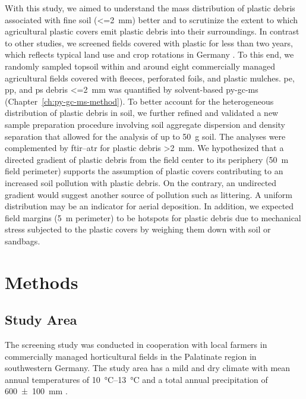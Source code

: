 With this study, we aimed to understand the mass distribution of plastic debris associated with fine soil (\SI{<=2}{\milli\meter}) better and to scrutinize the extent to which agricultural plastic covers emit plastic debris into their surroundings. In contrast to other studies, we screened fields covered with plastic for less than two years, which reflects typical land use and crop rotations in Germany \citep{HarmsAmount2021}.
To this end, we randomly sampled topsoil within and around eight commercially managed agricultural fields covered with fleeces, perforated foils, and plastic mulches. \ac{pe}, \ac{pp}, and \ac{ps} debris \SI{<=2}{\milli\meter} was quantified by solvent-based \ac{py-gc-ms} (Chapter~\ref{ch:py-gc-ms-method}). To better account for the heterogeneous distribution of plastic debris in soil, we further refined and validated a new sample preparation procedure involving soil aggregate dispersion and density separation that allowed for the analysis of up to \SI{50}{\gram} soil. The analyses were complemented by \ac{ftir}--\ac{atr} for plastic debris \SI{>2}{\milli\meter}.
We hypothesized that a directed gradient of plastic debris from the field center to its periphery (\SI{50}{\meter} field perimeter) supports the assumption of plastic covers contributing to an increased soil pollution with plastic debris. On the contrary, an undirected gradient would suggest another source of pollution such as littering. A uniform distribution may be an indicator for aerial deposition. In addition, we expected field margins (\SI{5}{\meter} perimeter) to be hotspots for plastic debris due to mechanical stress subjected to the plastic covers by weighing them down with soil or sandbags.

\section{Methods}

\subsection{Study Area}

The screening study was conducted in cooperation with local farmers in commercially managed horticultural fields in the Palatinate region in southwestern Germany.
The study area has a mild and dry climate with mean annual temperatures of \SIrange{10}{13}{\degreeCelsius} and a total annual precipitation of \SI{600(100)}{\milli\meter} \citep{AgrarmeteorologieRheinland-PfalzWetterdaten2020}.

